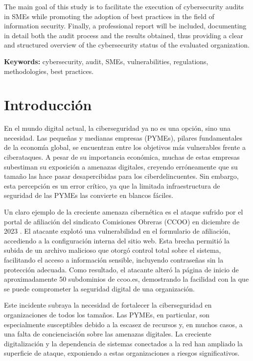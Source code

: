 \documentclass[a4paper, 10pt]{article}
\begin{document}
The main goal of this study is to facilitate the execution of cybersecurity audits in SMEs while promoting the adoption of best practices in the field of information security. Finally, a professional report will be included, documenting in detail both the audit process and the results obtained, thus providing a clear and structured overview of the cybersecurity status of the evaluated organization.
\par\vspace{0.5cm}
\textbf{Keywords:} cybersecurity, audit, SMEs, vulnerabilities, regulations, methodologies, best practices.
\clearpage



\section{Introducción}
En el mundo digital actual, la ciberseguridad ya no es una opción, sino una necesidad. Las pequeñas y medianas empresas (PYMEs), pilares fundamentales de la economía global, se encuentran entre los objetivos más vulnerables frente a ciberataques. A pesar de su importancia económica, 
muchas de estas empresas subestiman su exposición a amenazas digitales, creyendo erróneamente que su tamaño las hace pasar desapercibidas para los ciberdelincuentes. Sin embargo, esta percepción es un error crítico, ya que la limitada infraestructura de seguridad de las 
PYMEs las convierte en blancos fáciles. 
\par\vspace{0.5cm}

Un claro ejemplo de la creciente amenaza cibernética es el ataque sufrido por el portal de afiliación del sindicato Comisiones Obreras (CCOO) en diciembre de 2023 \cite{farlopa}. El atacante explotó una vulnerabilidad en el formulario de afiliación, accediendo a la configuración interna del sitio web. Esta brecha permitió la subida de un archivo malicioso que otorgó control total sobre el sistema, facilitando el acceso a información sensible, incluyendo contraseñas sin la protección adecuada. Como resultado, el atacante alteró la página de inicio de aproximadamente 50 subdominios de ccoo.es, demostrando la facilidad con la que se puede comprometer la seguridad digital de una organización.
\par\vspace{0.5cm}

Este incidente subraya la necesidad de fortalecer la ciberseguridad en organizaciones de todos los tamaños. Las PYMEs, en particular, son especialmente susceptibles debido a la escasez de recursos y, en muchos casos, a una falta de concienciación sobre las amenazas digitales. 
La creciente digitalización y la dependencia de sistemas conectados a la red han ampliado la superficie de ataque, exponiendo a estas organizaciones a riesgos significativos.
\par\vspace{0.5cm}
\end{document}
